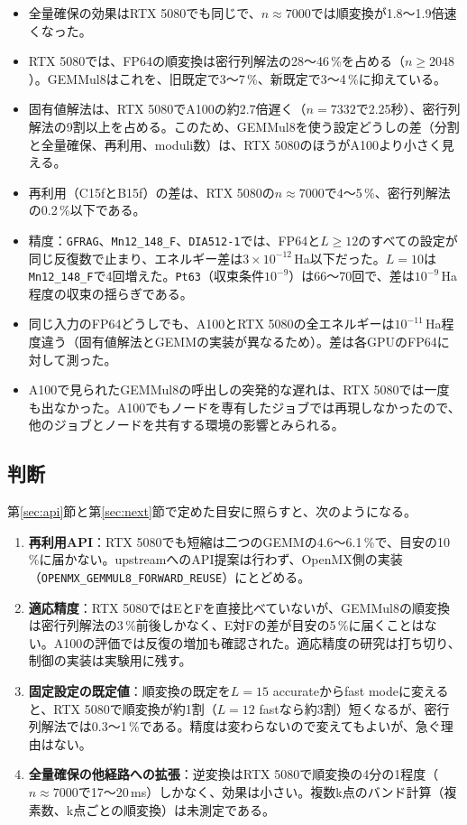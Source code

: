 \documentclass[a4paper,11pt]{ltjsarticle}
\newcommand{\code}[1]{\texttt{#1}}
\newcommand{\E}[1]{\times10^{#1}}
\begin{document}
\medskip
\begin{itemize}
\item 全量確保の効果はRTX 5080でも同じで、$n\approx7000$では順変換が1.8〜1.9倍速くなった。
\item RTX 5080では、FP64の順変換は密行列解法の28〜46\,\%を占める（$n\ge2048$）。GEMMul8はこれを、旧既定で3〜7\,\%、新既定で3〜4\,\%に抑えている。
\item 固有値解法は、RTX 5080でA100の約2.7倍遅く（$n=7332$で2.25秒）、密行列解法の9割以上を占める。このため、GEMMul8を使う設定どうしの差（分割と全量確保、再利用、moduli数）は、RTX 5080のほうがA100より小さく見える。
\item 再利用（C15fとB15f）の差は、RTX 5080の$n\approx7000$で4〜5\,\%、密行列解法の0.2\,\%以下である。
\item 精度：\code{GFRAG}、\code{Mn12\_148\_F}、\code{DIA512-1}では、FP64と$L\ge12$のすべての設定が同じ反復数で止まり、エネルギー差は$3\E{-12}$\,Ha以下だった。$L=10$は\code{Mn12\_148\_F}で4回増えた。\code{Pt63}（収束条件$10^{-9}$）は66〜70回で、差は$10^{-9}$\,Ha程度の収束の揺らぎである。
\item 同じ入力のFP64どうしでも、A100とRTX 5080の全エネルギーは$10^{-11}$\,Ha程度違う（固有値解法とGEMMの実装が異なるため）。差は各GPUのFP64に対して測った。
\item A100で見られたGEMMul8の呼出しの突発的な遅れは、RTX 5080では一度も出なかった。A100でもノードを専有したジョブでは再現しなかったので、他のジョブとノードを共有する環境の影響とみられる。
\end{itemize}

\subsection{判断}
第\ref{sec:api}節と第\ref{sec:next}節で定めた目安に照らすと、次のようになる。
\begin{enumerate}
\item \textbf{再利用API}：RTX 5080でも短縮は二つのGEMMの4.6〜6.1\,\%で、目安の10\,\%に届かない。upstreamへのAPI提案は行わず、OpenMX側の実装（\code{OPENMX\_GEMMUL8\_FORWARD\_REUSE}）にとどめる。
\item \textbf{適応精度}：RTX 5080ではEとFを直接比べていないが、GEMMul8の順変換は密行列解法の3\,\%前後しかなく、E対Fの差が目安の5\,\%に届くことはない。A100の評価では反復の増加も確認された。適応精度の研究は打ち切り、制御の実装は実験用に残す。
\item \textbf{固定設定の既定値}：順変換の既定を$L=15$ accurateからfast modeに変えると、RTX 5080で順変換が約1割（$L=12$ fastなら約3割）短くなるが、密行列解法では0.3〜1\,\%である。精度は変わらないので変えてもよいが、急ぐ理由はない。
\item \textbf{全量確保の他経路への拡張}：逆変換はRTX 5080で順変換の4分の1程度（$n\approx7000$で17〜20\,ms）しかなく、効果は小さい。複数k点のバンド計算（複素数、k点ごとの順変換）は未測定である。
\end{enumerate}
\end{document}
